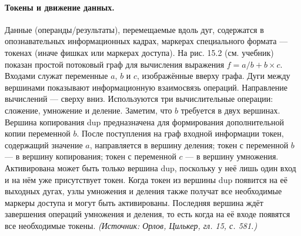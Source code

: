 \documentclass[a4paper,12pt]{article}
\begin{document}
\paragraph{Токены и движение данных.}
Данные (операнды/результаты), перемещаемые вдоль дуг, содержатся в опознавательных информационных кадрах, маркерах специального формата — токенах (иначе фишках или маркерах доступа). На рис. 15.2 (см. учебник) показан простой потоковый граф для вычисления выражения \(f=a/b+b\times c\). Входами служат переменные \(a\), \(b\) и \(c\), изображённые вверху графа. Дуги между вершинами показывают информационную взаимосвязь операций. Направление вычислений — сверху вниз. Используются три вычислительные операции: сложение, умножение и деление. Заметим, что \(b\) требуется в двух вершинах. Вершина копирования dup предназначена для формирования дополнительной копии переменной \(b\). После поступления на граф входной информации токен, содержащий значение \(a\), направляется в вершину деления; токен с переменной \(b\) — в вершину копирования; токен с переменной \(c\) — в вершину умножения. Активирована может быть только вершина dup, поскольку у неё лишь один вход и на нём уже присутствует токен. Когда токен из вершины dup появится на её выходных дугах, узлы умножения и деления также получат все необходимые маркеры доступа и могут быть активированы. Последняя вершина ждёт завершения операций умножения и деления, то есть когда на её входе появятся все необходимые токены.
\textit{(Источник: Орлов, Цилькер, гл. 15, с. 581.)}
\end{document}
